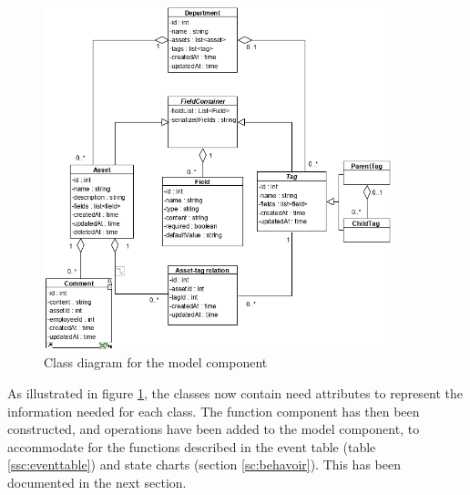 \begin{figure}[H]
    \centering
    \includegraphics[width=0.9\textwidth]{figures/ClassDiagrams/ModelComponentClassDiagram.png}
    \caption{Class diagram for the model component}
    \label{fig:ModelComponentClassDiagram}
\end{figure}

As illustrated in figure \ref{fig:ModelComponentClassDiagram}, the classes now contain need attributes to represent the information needed for each class. The function component has then been constructed, and operations have been added to the model component, to accommodate for the functions described in the event table (table \ref{ssc:eventtable}) and state charts (section \ref{sc:behavoir}). This has been documented in the next section.